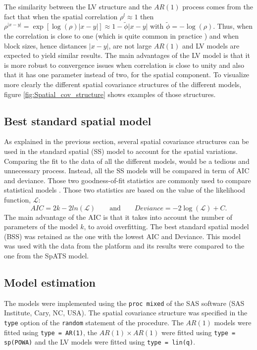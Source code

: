 The similarity between the LV structure and the $AR(1)$ process comes from the fact that when the spatial correlation $\rho^{l} \approx 1$ then 
$\rho^{\left| x-y \right|}=\exp \left[\log (\rho)\left| x-y \right|\right] \approx 1-\tilde{\phi}\left| x -y \right|$ with 
$\tilde{\phi} = -\log(\rho)$. 
Thus, when the correlation is close to one (which is quite common in practice \parencite{pilarczyk2007extent}) and when block sizes, hence distances $\left| x-y \right|$, are not large $AR(1)$ and LV models are expected to yield similar results. The main advantages of the LV model is that it is more robust to convergence issues when correlation is close to unity and also that it has one parameter instead of two, for the spatial component. To visualize more clearly the different spatial covariance structures of the different models, figure \ref{fig:Spatial_cov_structure} shows examples of those structures. 



\subsection{Best standard spatial model}
As explained in the previous section, several spatial covariance structures can be used in the standard spatial (SS) model to account for the spatial variations. Comparing the fit to the data of all the different models, would be a tedious and unnecessary process. Instead, all the SS models will be compared in term of AIC and deviance. Those two goodness-of-fit statistics are commonly used to compare statistical models \parencite{piepho_linear_2010,gilmour_accounting_1997,velazco_modelling_2017}. Those two statistics are based on the value of the likelihood function, $\mathcal{L}$:
\begin{equation}
	AIC = 2k - 2ln(\mathcal{L}) \qquad \text{and} \qquad Deviance = -2\log(\mathcal{L})+C
	\text{.}
\end{equation}
The main advantage of the AIC is that it takes into account the number of parameters of the model $k$, to avoid overfitting. The best standard spatial model (BSS) was retained as the one with the lowest AIC and Deviance. This model was used with the data from the platform and its results were compared to the one from the SpATS model.

\subsection{Model estimation}
The models were implemented using the \verb|proc mixed| of the SAS software (SAS Institute, Cary, NC, USA). The spatial covariance structure was specified in the \verb|type| option of the \verb|random| statement of the procedure. The $AR(1)$ models were fitted using \verb|type = AR(1)|, the $AR(1)\times AR(1)$ were fitted using \verb|type = sp(POWA)| and the LV models were fitted using \verb|type = lin(q)|.

